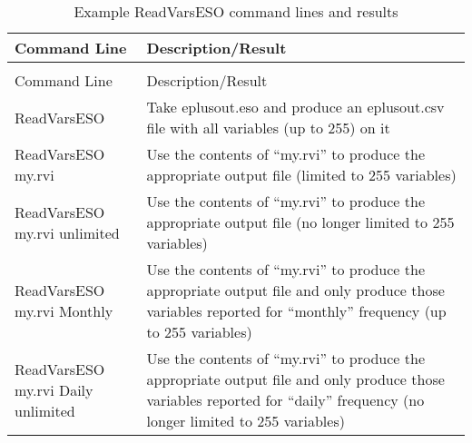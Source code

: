 \begin{longtable}[c]{p{1.5in}p{4.5in}}
\caption{Example ReadVarsESO command lines and results \label{table:example-readvarseso-command-lines-and-results}} \tabularnewline
\toprule 
Command Line & Description/Result \tabularnewline
\midrule
\endfirsthead

\caption[]{Example ReadVarsESO command lines and results} \tabularnewline
\toprule 
Command Line & Description/Result \tabularnewline
\midrule
\endhead

ReadVarsESO & Take eplusout.eso and produce an eplusout.csv file with all variables (up to 255) on it \tabularnewline
ReadVarsESO my.rvi & Use the contents of “my.rvi” to produce the appropriate output file (limited to 255 variables) \tabularnewline
ReadVarsESO my.rvi unlimited & Use the contents of “my.rvi” to produce the appropriate output file (no longer limited to 255 variables) \tabularnewline
ReadVarsESO my.rvi Monthly & Use the contents of “my.rvi” to produce the appropriate output file and only produce those variables reported for “monthly” frequency (up to 255 variables) \tabularnewline
ReadVarsESO my.rvi Daily unlimited & Use the contents of “my.rvi” to produce the appropriate output file and only produce those variables reported for “daily” frequency (no longer limited to 255 variables) \tabularnewline
\bottomrule
\end{longtable}
